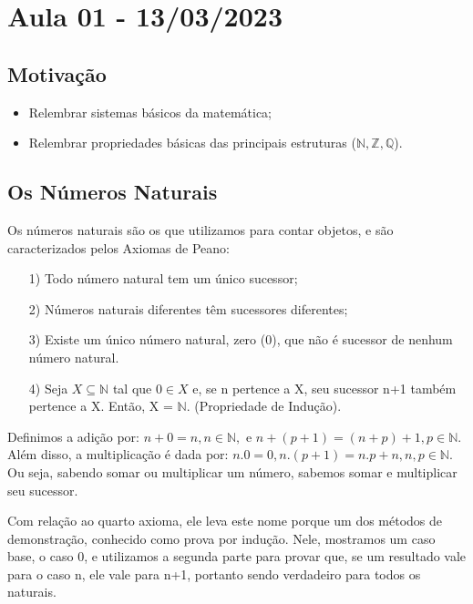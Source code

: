 \documentclass[Analysis/analysis_notes.tex]{subfiles}
\begin{document}
\section{Aula 01 - 13/03/2023}
\subsection{Motiva\c c\~ao}
\begin{itemize}
	\item Relembrar sistemas b\'asicos da matem\'atica;
	\item Relembrar propriedades b\'asicas das principais estruturas ($\mathbb{N}, \mathbb{Z}, \mathbb{Q}$).
\end{itemize}

\subsection{Os N\'umeros Naturais}
Os n\'umeros naturais s\~ao os que utilizamos para contar objetos, e s\~ao caracterizados pelos Axiomas de Peano:
\begin{itemize}
	\item[1)] Todo n\'umero natural tem um \'unico sucessor;
	\item[2)] N\'umeros naturais diferentes t\^em sucessores diferentes;
	\item[3)] Existe um \'unico n\'umero natural, zero (0), que n\~ao \'e sucessor de nenhum n\'umero natural.
	\item[4)] Seja $X \subseteq{\mathbb{N}}$ tal que $0\in{X}$ e, se n pertence a X, seu sucessor n+1 tamb\'em pertence
	      a X. Ent\~ao, X = $\mathbb{N}.$ (Propriedade de Indu\c c\~ao).
\end{itemize}

\begin{def*}
	Definimos a adi\c c\~ao por: $n + 0 = n, n\in \mathbb{N},\text{ e }n+(p+1) = (n+p)+1, p\in{\mathbb{N}}$. Al\'em disso,
	a multiplica\c c\~ao \'e dada por: $n.0 = 0, n.(p+1) = n.p + n, n, p\in\mathbb{N}.$ Ou seja, sabendo somar ou multiplicar um n\'umero,
	sabemos somar e multiplicar seu sucessor.
\end{def*}
Com rela\c c\~ao ao quarto axioma, ele leva este nome porque um dos m\'etodos de demonstra\c c\~ao, conhecido como
prova por indu\c c\~ao. Nele, mostramos um caso base, o caso 0, e utilizamos a segunda parte para provar que, se um
resultado vale para o caso n, ele vale para n+1, portanto sendo verdadeiro para todos os naturais.
\end{document}

